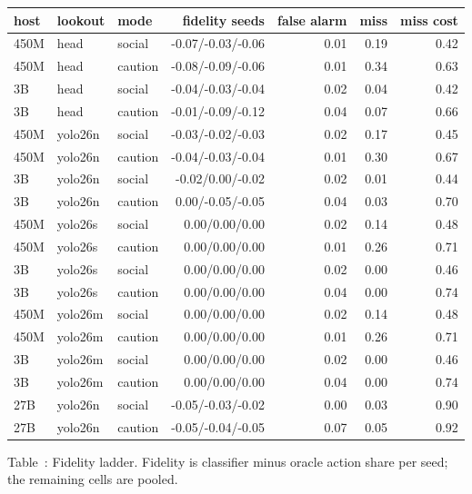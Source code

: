 \documentclass[11pt]{article}
\begin{document}
\begin{center}
{\scriptsize
\setlength{\tabcolsep}{3pt}%
\begin{tabular}{lllrrrr}
\toprule
host & lookout & mode & fidelity seeds & false alarm & miss & miss cost \\
\midrule
450M & head & social & -0.07/-0.03/-0.06 & 0.01 & 0.19 & 0.42 \\
450M & head & caution & -0.08/-0.09/-0.06 & 0.01 & 0.34 & 0.63 \\
3B & head & social & -0.04/-0.03/-0.04 & 0.02 & 0.04 & 0.42 \\
3B & head & caution & -0.01/-0.09/-0.12 & 0.04 & 0.07 & 0.66 \\
450M & yolo26n & social & -0.03/-0.02/-0.03 & 0.02 & 0.17 & 0.45 \\
450M & yolo26n & caution & -0.04/-0.03/-0.04 & 0.01 & 0.30 & 0.67 \\
3B & yolo26n & social & -0.02/0.00/-0.02 & 0.02 & 0.01 & 0.44 \\
3B & yolo26n & caution & 0.00/-0.05/-0.05 & 0.04 & 0.03 & 0.70 \\
450M & yolo26s & social & 0.00/0.00/0.00 & 0.02 & 0.14 & 0.48 \\
450M & yolo26s & caution & 0.00/0.00/0.00 & 0.01 & 0.26 & 0.71 \\
3B & yolo26s & social & 0.00/0.00/0.00 & 0.02 & 0.00 & 0.46 \\
3B & yolo26s & caution & 0.00/0.00/0.00 & 0.04 & 0.00 & 0.74 \\
450M & yolo26m & social & 0.00/0.00/0.00 & 0.02 & 0.14 & 0.48 \\
450M & yolo26m & caution & 0.00/0.00/0.00 & 0.01 & 0.26 & 0.71 \\
3B & yolo26m & social & 0.00/0.00/0.00 & 0.02 & 0.00 & 0.46 \\
3B & yolo26m & caution & 0.00/0.00/0.00 & 0.04 & 0.00 & 0.74 \\
27B & yolo26n & social & -0.05/-0.03/-0.02 & 0.00 & 0.03 & 0.90 \\
27B & yolo26n & caution & -0.05/-0.04/-0.05 & 0.07 & 0.05 & 0.92 \\
\bottomrule
\end{tabular}
}
\end{center}
\noindent Table~\thetable: Fidelity ladder. Fidelity is classifier minus oracle action share per seed; the remaining cells are pooled.
\label{tab:fidelity}
\par
\end{document}
